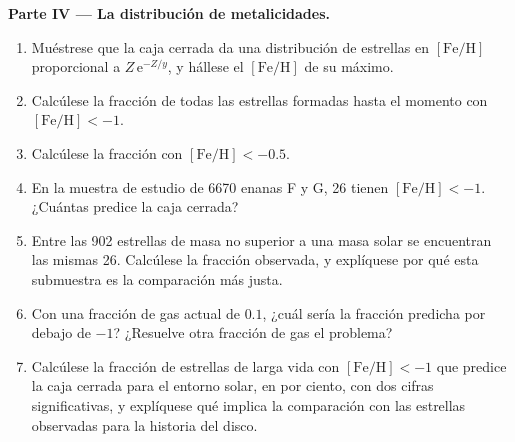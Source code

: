 \begin{problem}
\medskip\noindent\textbf{Parte IV --- La distribución de metalicidades.}
\begin{enumerate}[resume]
\item Muéstrese que la caja cerrada da una distribución de estrellas en
  $[\mathrm{Fe/H}]$ proporcional a $Z\,\mathrm{e}^{-Z/y}$, y hállese el
  $[\mathrm{Fe/H}]$ de su máximo.
\item Calcúlese la fracción de todas las estrellas formadas hasta el momento con
  $[\mathrm{Fe/H}] < -1$.
\item Calcúlese la fracción con $[\mathrm{Fe/H}] < -0.5$.
\item En la muestra de estudio de 6670 enanas F y G, 26 tienen
  $[\mathrm{Fe/H}] < -1$. ¿Cuántas predice la caja cerrada?
\item Entre las 902 estrellas de masa no superior a una masa solar se encuentran
  las mismas 26. Calcúlese la fracción observada, y explíquese por qué esta
  submuestra es la comparación más justa.
\item Con una fracción de gas actual de $0.1$, ¿cuál sería la fracción predicha
  por debajo de $-1$? ¿Resuelve otra fracción de gas el
  problema?
\item Calcúlese la fracción de estrellas de larga vida con $[\mathrm{Fe/H}] < -1$
  que predice la caja cerrada para el entorno solar, en por ciento, con dos
  cifras significativas, y explíquese qué implica la comparación con las
  estrellas observadas para la historia del disco.
\end{enumerate}
\end{problem}
